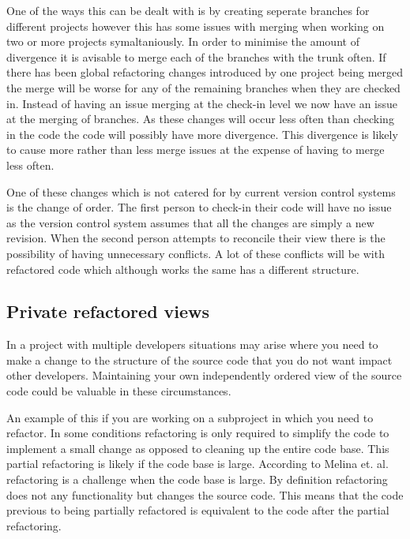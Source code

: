 One of the ways this can be dealt with is by creating seperate branches for different projects however this has some issues with merging when working on two or more projects symaltaniously.  In order to minimise the amount of divergence it is avisable to merge each of the branches with the trunk often.  If there has been global refactoring changes introduced by one project being merged the merge will be worse for any of the remaining branches when they are checked in.  Instead of having an issue merging at the check-in level we now have an issue at the merging of branches.  As these changes will occur less often than checking in the code the code will possibly have more divergence.  This divergence is likely to cause more rather than less merge issues at the expense of having to merge less often.


One of these changes which is not catered for by current version control systems is the change of order.  The first person to check-in their code will have no issue as the version control system assumes that all the changes are simply a new revision.  When the second person attempts to reconcile their view there is the possibility of having unnecessary conflicts.  A lot of these conflicts will be with refactored code which although works the same has a different structure.

\subsection{Private refactored views}
In a project with multiple developers situations may arise where you need to make a change to the structure of the source code that you do not want impact other developers.  Maintaining your own independently ordered view of the source code could be valuable in these circumstances. 

An example of this if you are working on a subproject in which you need to refactor. In some conditions refactoring is only required to simplify the code to implement a small change as opposed to cleaning up the entire code base.  This partial refactoring is likely if the code base is large. According to Melina et. al. \cite{Milea2014} refactoring is a challenge when the code base is large. By definition refactoring does not any functionality but changes the source code. This means that the code previous to being partially refactored is equivalent to the code after the partial refactoring.



